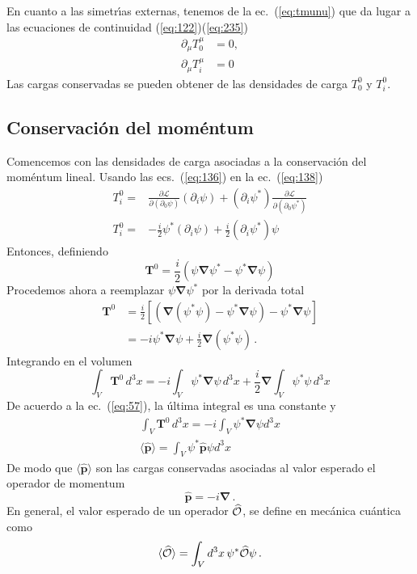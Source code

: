 En cuanto a las simetr\'\i as externas, tenemos de la ec.~(\ref{eq:tmunu}) que
da lugar a las ecuaciones de continuidad (\ref{eq:122})(\ref{eq:235})
\begin{align}
  \partial_\mu T^\mu_0&=0,\nonumber\\
\partial_\mu{T}^\mu_i&=0
\end{align}
Las cargas conservadas se pueden obtener de las densidades de carga
$T^0_0$ y $T^0_i$. 

\subsection{Conservación del moméntum}
Comencemos con las densidades de carga asociadas a
la conservación del moméntum lineal.
Usando  las ecs.~(\ref{eq:136}) en la ec.~(\ref{eq:138})
\begin{align}
  T^0_i=&\frac{\partial\mathcal{L}}{\partial(\partial_0\psi)}(\partial_i\psi)
  +(\partial_i\psi^*)\frac{\partial\mathcal{L}}{\partial(\partial_0\psi^*)}\nonumber\\
  T^0_i=&-\frac{i}{2}\psi^*(\partial_i\psi)+\frac{i}{2}(\partial_i\psi^*)\psi
\end{align}
Entonces, definiendo
\begin{equation}
   \mathbf{T}^0=\frac{i}{2}
  \left(
    \psi\boldsymbol{\nabla}\psi^*-\psi^*\boldsymbol{\nabla}\psi
  \right)
\end{equation}
Procedemos ahora a reemplazar $\psi\boldsymbol{\nabla}\psi^*$ por la
derivada total
\begin{align}
 \mathbf{T}^0&=\frac{i}{2}
  \left[\left( 
    \boldsymbol{\nabla}(\psi^*\psi)-\psi^*\boldsymbol{\nabla}\psi \right)-\psi^*\boldsymbol{\nabla}\psi
  \right]\nonumber\\
&=-i\psi^*\boldsymbol{\nabla}\psi+\frac{i}{2}\boldsymbol{\nabla}(\psi^*\psi)\,.
\end{align}
Integrando en el volumen
\begin{equation}
  \int_V \mathbf{T}^0\, d^3x=-i\int_V \psi^*\boldsymbol{\nabla}\psi\, d^3x+\frac{i}{2}\boldsymbol{\nabla}\int_V\psi^*\psi\,d^3x
\end{equation}
De acuerdo a la ec.~(\ref{eq:57}), la \'ultima integral es una constante y
\begin{align}
  \label{eq:140}
  \int_V \mathbf{T}^0\, d^3x=-i\int_V \psi^*\boldsymbol{\nabla}\psi d^3x\nonumber\\
\langle\widehat{\mathbf{p}}\rangle=\int_V \psi^*\widehat{\mathbf{p}}\psi d^3x
\end{align}
De modo que $\langle\widehat{\mathbf{p}}\rangle$ son las cargas conservadas asociadas al valor esperado el operador de momentum
\begin{equation}
  \widehat{\mathbf{p}}=-i\boldsymbol{\nabla}\,.
\end{equation}
En general, el valor esperado de un operador $ \widehat{\cal O}$, se define en mecánica cuántica como
\begin{align*}
  \langle\widehat{\cal O}\rangle=\int_V d^3x\,\psi^{*}\widehat{\cal O}\psi\,.
\end{align*}

